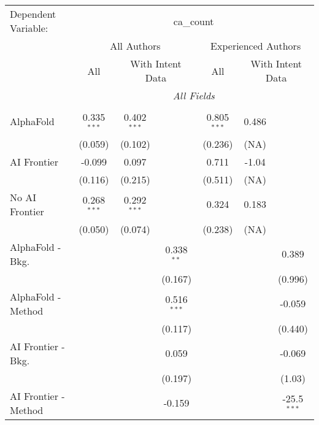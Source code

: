 \begingroup
\centering
\begin{tabular}{lcccccc}
   \tabularnewline \midrule \midrule
   Dependent Variable: & \multicolumn{6}{c}{ca\_count}\\
 & \multicolumn{3}{c}{All Authors} & \multicolumn{3}{c}{Experienced Authors} \\
\cmidrule(lr){2-4} \cmidrule(lr){5-7}
 & \multicolumn{1}{c}{All} & \multicolumn{2}{c}{With Intent Data} & \multicolumn{1}{c}{All} & \multicolumn{2}{c}{With Intent Data} \\
\cmidrule(lr){2-2} \cmidrule(lr){3-4} \cmidrule(lr){5-5} \cmidrule(lr){6-7}
 & \multicolumn{6}{c}{\textit{All Fields}} \\ \\
   AlphaFold               & 0.335$^{***}$ & 0.402$^{***}$ &               & 0.805$^{***}$ & 0.486 &   \\   
                           & (0.059)       & (0.102)       &               & (0.236)       & (NA)  &   \\   
   AI Frontier             & -0.099        & 0.097         &               & 0.711         & -1.04 &   \\   
                           & (0.116)       & (0.215)       &               & (0.511)       & (NA)  &   \\   
   No AI Frontier          & 0.268$^{***}$ & 0.292$^{***}$ &               & 0.324         & 0.183 &   \\   
                           & (0.050)       & (0.074)       &               & (0.238)       & (NA)  &   \\   
   AlphaFold - Bkg.        &               &               & 0.338$^{**}$  &               &       & 0.389\\   
                           &               &               & (0.167)       &               &       & (0.996)\\   
   AlphaFold - Method      &               &               & 0.516$^{***}$ &               &       & -0.059\\   
                           &               &               & (0.117)       &               &       & (0.440)\\   
   AI Frontier - Bkg.      &               &               & 0.059         &               &       & -0.069\\   
                           &               &               & (0.197)       &               &       & (1.03)\\   
   AI Frontier - Method    &               &               & -0.159        &               &       & -25.5$^{***}$\\   

\end{tabular}
